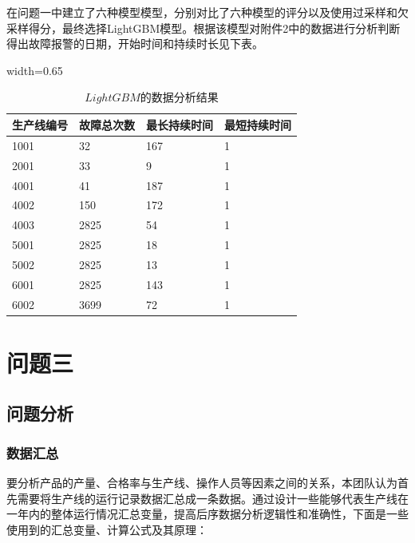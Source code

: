 \documentclass[withoutpreface,bwprint]{cumcmthesis}
\begin{document}
在问题一中建立了六种模型模型，分别对比了六种模型的评分以及使用过采样和欠采样得分，最终选择LightGBM模型。根据该模型对附件2中的数据进行分析判断得出故障报警的日期，开始时间和持续时长见下表。

\begin{table}[h]
\centering
\begin{adjustbox}{width=0.65\textwidth}
\begin{tabular}{llll}
\toprule
生产线编号 & 故障总次数 & 最长持续时间 & 最短持续时间 \\ \midrule
1001  & 32 & 167    & 1      \\
2001  & 33          & 9      & 1      \\
4001  & 41          & 187    & 1      \\
4002  & 150         & 172    & 1      \\
4003  & 2825        & 54     & 1      \\
5001  & 2825        & 18     & 1      \\
5002  & 2825        & 13     & 1      \\
6001  & 2825        & 143    & 1      \\
6002  & 3699        & 72     & 1      \\ \bottomrule
\end{tabular}
\end{adjustbox}
\caption{\(LightGBM\)的数据分析结果}
\end{table}


\newpage
\section{问题三}

\subsection{问题分析}

\subsubsection{数据汇总}

要分析产品的产量、合格率与生产线、操作人员等因素之间的关系，本团队认为首先需要将生产线的运行记录数据汇总成一条数据。通过设计一些能够代表生产线在一年内的整体运行情况汇总变量，提高后序数据分析逻辑性和准确性，下面是一些使用到的汇总变量、计算公式及其原理：
\end{document}

